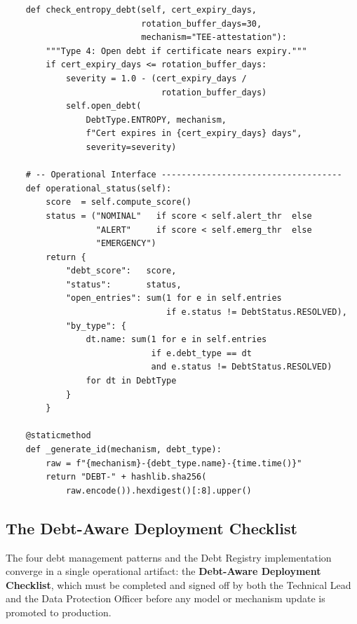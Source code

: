 \begin{lstlisting}
    def check_entropy_debt(self, cert_expiry_days,
                           rotation_buffer_days=30,
                           mechanism="TEE-attestation"):
        """Type 4: Open debt if certificate nears expiry."""
        if cert_expiry_days <= rotation_buffer_days:
            severity = 1.0 - (cert_expiry_days /
                               rotation_buffer_days)
            self.open_debt(
                DebtType.ENTROPY, mechanism,
                f"Cert expires in {cert_expiry_days} days",
                severity=severity)

    # -- Operational Interface ------------------------------------
    def operational_status(self):
        score  = self.compute_score()
        status = ("NOMINAL"   if score < self.alert_thr  else
                  "ALERT"     if score < self.emerg_thr  else
                  "EMERGENCY")
        return {
            "debt_score":   score,
            "status":       status,
            "open_entries": sum(1 for e in self.entries
                                if e.status != DebtStatus.RESOLVED),
            "by_type": {
                dt.name: sum(1 for e in self.entries
                             if e.debt_type == dt
                             and e.status != DebtStatus.RESOLVED)
                for dt in DebtType
            }
        }

    @staticmethod
    def _generate_id(mechanism, debt_type):
        raw = f"{mechanism}-{debt_type.name}-{time.time()}"
        return "DEBT-" + hashlib.sha256(
            raw.encode()).hexdigest()[:8].upper()
\end{lstlisting}

\subsection{The Debt-Aware Deployment Checklist}
\label{subsec:deployment-checklist}

The four debt management patterns and the Debt Registry
implementation converge in a single operational artifact:
the \textbf{Debt-Aware Deployment Checklist}, which must
be completed and signed off by both the Technical Lead and
the Data Protection Officer before any model or mechanism
update is promoted to production.

